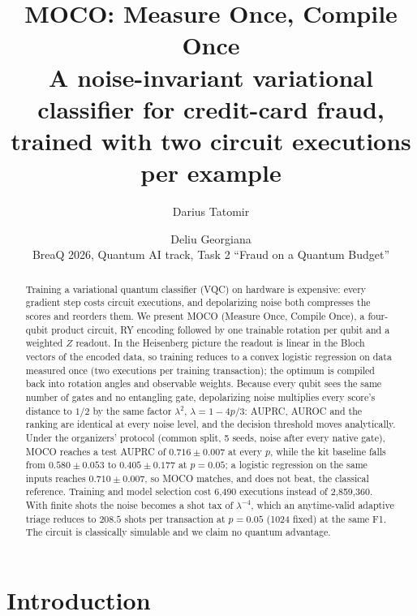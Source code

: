 \documentclass[10pt,twocolumn]{article}
\title{MOCO: Measure Once, Compile Once\\[2pt]
\large A noise-invariant variational classifier for credit-card fraud, trained with two circuit executions per example}
\author{Darius Tatomir \and Deliu Georgiana\\[2pt]\small BreaQ 2026, Quantum AI track, Task 2 ``Fraud on a Quantum Budget''}
\date{}
\theoremstyle{definition}
\begin{document}
\maketitle

\begin{abstract}
Training a variational quantum classifier (VQC) on hardware is expensive: every gradient step costs circuit
executions, and depolarizing noise both compresses the scores and reorders them. We present MOCO (Measure Once,
Compile Once), a four-qubit product circuit, RY encoding followed by one trainable rotation per qubit and a weighted
$Z$ readout. In the Heisenberg picture the readout is linear in the Bloch vectors of the encoded data, so training
reduces to a convex logistic regression on data measured once (two executions per training transaction); the
optimum is compiled back into rotation angles and observable weights. Because every qubit sees the same number of
gates and no entangling gate, depolarizing noise multiplies every score's distance to $1/2$ by the same factor
$\lambda^2$, $\lambda = 1-4p/3$: AUPRC, AUROC and the ranking are identical at every noise level, and the decision
threshold moves analytically. Under the organizers' protocol (common split, 5 seeds, noise after every native
gate), MOCO reaches a test AUPRC of $0.716\pm0.007$ at every $p$, while the kit baseline falls from
$0.580\pm0.053$ to $0.405\pm0.177$ at $p=0.05$; a logistic regression on the same inputs reaches
$0.710\pm0.007$, so MOCO matches, and does not beat, the classical reference. Training and model selection cost
6,490 executions instead of 2,859,360. With finite shots the noise becomes a shot tax of $\lambda^{-4}$, which an
anytime-valid adaptive triage reduces to $208.5$ shots per transaction at $p=0.05$ (1024 fixed) at the same F1.
The circuit is classically simulable and we claim no quantum advantage.
\end{abstract}

\section{Introduction}
\end{document}
